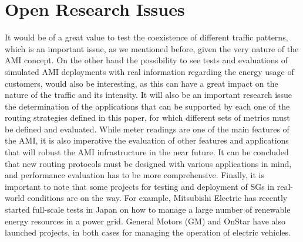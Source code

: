 \documentclass[11pt,draftclsnofoot,onecolumn]{IEEEtran}
\begin{document}
\section{Open Research Issues}\label{issues}
It would be of a great value to test the coexistence of different traffic patterns, which is an important issue, as we mentioned before, given the very nature of the AMI concept. On the other hand the possibility to see tests and evaluations of simulated AMI deployments with real information regarding the energy usage of customers, would also be interesting, as this can have a great impact on the nature of the traffic and its intensity. It will also be an important research issue the determination of the applications that can be supported by each one of the routing strategies defined in this paper, for which different sets of metrics must be defined and evaluated. While meter readings are one of the main features of the AMI, it is also imperative the evaluation of other features and applications that will robust the AMI infrastructure in the near future. It can be concluded that new routing protocols must be designed with various applications in mind, and performance evaluation has to be more comprehensive. Finally, it is important to note that some projects for testing and deployment of SGs in real-world conditions are on the way. For example, Mitsubishi Electric has recently started full-scale tests in Japan on how to manage a large number of renewable energy resources in a power grid. General Motors (GM) and OnStar have also launched projects, in both cases for managing the operation of electric vehicles.


%
%
%
%
%


\ifCLASSOPTIONcaptionsoff
  \newpage
\fi
\end{document}
